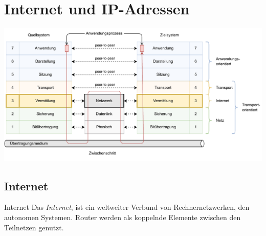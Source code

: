 \section{Internet und IP-Adressen}

\includegraphics[width=\textwidth]{includes/figures/defi_iso_osi_network.pdf}

\subsection{Internet}

\begin{defi}{Internet}
    Das \emph{Internet}, ist ein weltweiter Verbund von Rechnernetzwerken, den autonomen Systemen.
    Router werden als koppelnde Elemente zwischen den Teilnetzen genutzt.
\end{defi}

